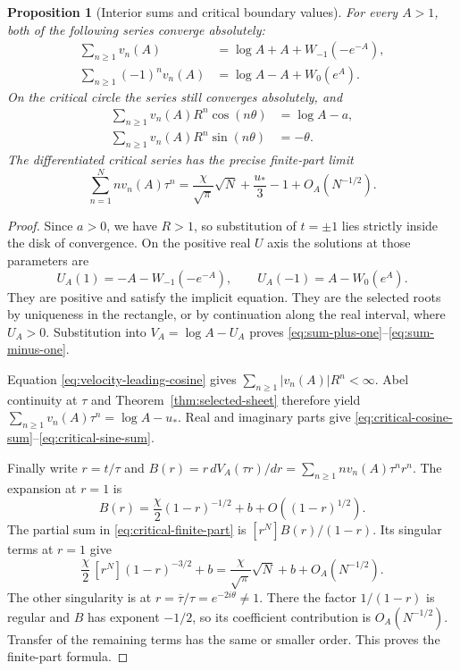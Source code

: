 \documentclass[11pt]{article}
\numberwithin{equation}{section}
\newtheorem{proposition}[theorem]{Proposition}
\theoremstyle{definition}
\theoremstyle{remark}
\begin{document}
\begin{proposition}[Interior sums and critical boundary values]
\label{prop:velocity-summations}
For every $A>1$, both of the following series converge absolutely:
\begin{align}
 \sum_{n\geq1}v_n(A)
    &=\log A+A+W_{-1}(-e^{-A}),
                       \label{eq:sum-plus-one}\\
 \sum_{n\geq1}(-1)^n v_n(A)
    &=\log A-A+W_0(e^A).
                       \label{eq:sum-minus-one}
\end{align}
On the critical circle the series still converges absolutely, and
\begin{align}
 \sum_{n\geq1}v_n(A)R^n\cos(n\theta)&=\log A-a,
                           \label{eq:critical-cosine-sum}\\
 \sum_{n\geq1}v_n(A)R^n\sin(n\theta)&=-\theta.
                           \label{eq:critical-sine-sum}
\end{align}
The differentiated critical series has the precise finite-part limit
\begin{equation}\label{eq:critical-finite-part}
 \sum_{n=1}^N n v_n(A)\tau^n
   =\frac{\chi}{\sqrt\pi}\sqrt N+\frac{u_*}{3}-1
                  +O_A(N^{-1/2}).
\end{equation}
\end{proposition}

\begin{proof}
Since $a>0$, we have $R>1$, so substitution of $t=\pm1$ lies strictly
inside the disk of convergence.  On the positive real $U$ axis the
solutions at those parameters are
\[
 U_A(1)=-A-W_{-1}(-e^{-A}),\qquad
 U_A(-1)=A-W_0(e^A).
\]
They are positive and satisfy the implicit equation.  They are the
selected roots by uniqueness in the rectangle, or by continuation along
the real interval, where $U_A>0$.  Substitution into $V_A=\log A-U_A$
proves \eqref{eq:sum-plus-one}--\eqref{eq:sum-minus-one}.

Equation \eqref{eq:velocity-leading-cosine} gives
$\sum_{n\geq1}|v_n(A)|R^n<\infty$.  Abel continuity at $\tau$ and
Theorem~\ref{thm:selected-sheet} therefore yield
$\sum_{n\geq1}v_n(A)\tau^n=\log A-u_*$.  Real and imaginary parts
give \eqref{eq:critical-cosine-sum}--\eqref{eq:critical-sine-sum}.

Finally write $r=t/\tau$ and
$B(r)=r\,dV_A(\tau r)/dr=\sum_{n\geq1}nv_n(A)\tau^n r^n$.
The expansion at $r=1$ is
\[
 B(r)=\frac\chi2(1-r)^{-1/2}+b+O((1-r)^{1/2}).
\]
The partial sum in \eqref{eq:critical-finite-part} is
$[r^N]B(r)/(1-r)$.  Its singular terms at $r=1$ give
\[
 \frac\chi2\,[r^N](1-r)^{-3/2}+b
     =\frac\chi{\sqrt\pi}\sqrt N+b+O_A(N^{-1/2}).
\]
The other singularity is at $r=\overline\tau/\tau=e^{-2i\theta}\neq1$.
There the factor $1/(1-r)$ is regular and $B$ has exponent $-1/2$,
so its coefficient contribution is $O_A(N^{-1/2})$.  Transfer of the
remaining terms has the same or smaller order.  This proves the
finite-part formula.
\end{proof}
\end{document}

